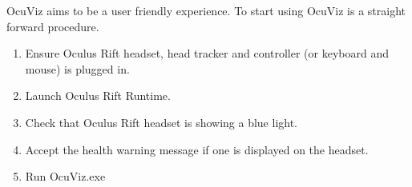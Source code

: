 \documentclass[a4paper,12pt]{article}
\begin{document}
OcuViz aims to be a user friendly experience. To start using OcuViz is a straight forward procedure.

\begin{enumerate}
\item Ensure Oculus Rift headset, head tracker and controller (or keyboard and mouse) is plugged in.
\item Launch Oculus Rift Runtime.
\item Check that Oculus Rift headset is showing a blue light. 
\item Accept the health warning message if one is displayed on the headset.
\item Run OcuViz.exe 
\end{enumerate}




















%
%
\end{document}
